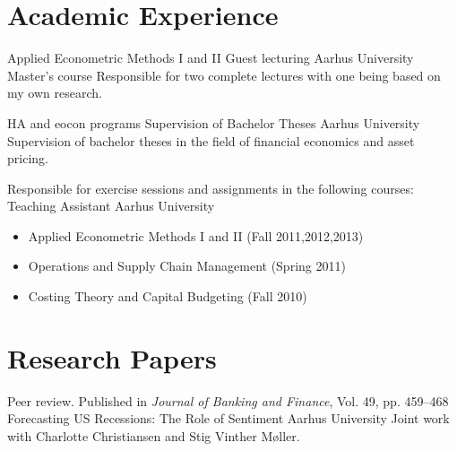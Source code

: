 \documentclass[11pt,a4paper,sans]{moderncv}
\begin{document}

\section{Academic Experience}

        {Applied Econometric Methods I and II}
        {Guest lecturing}
        {Aarhus University}
        {Master's course}
        {Responsible for two complete lectures with one being based on my own research.}

        {HA and eocon programs}
        {Supervision of Bachelor Theses}
        {Aarhus University}
        {}
        {Supervision of bachelor theses in the field of financial economics and asset pricing.}

        {Responsible for exercise sessions and assignments in the following courses:}
        {Teaching Assistant}
        {Aarhus University}
        {}
        {\begin{itemize}
        \item Applied Econometric Methods I and II (Fall 2011,2012,2013)
        \item Operations and Supply Chain Management (Spring 2011)
        \item Costing Theory and Capital Budgeting (Fall 2010)
        \end{itemize}}


\clearpage
\section{Research Papers}

        {Peer review. Published in \textit{Journal of Banking and Finance}, Vol. 49, pp. 459–468}
        {Forecasting US Recessions: The Role of Sentiment}
        {Aarhus University}
        {}
        {Joint work with Charlotte Christiansen and Stig Vinther Møller.}
\end{document}
